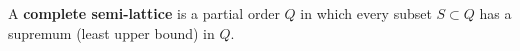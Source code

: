 A \textbf{complete semi-lattice} is a partial order $Q$ in which every subset $S \subset Q$ has a supremum (least upper bound) in $Q$.
